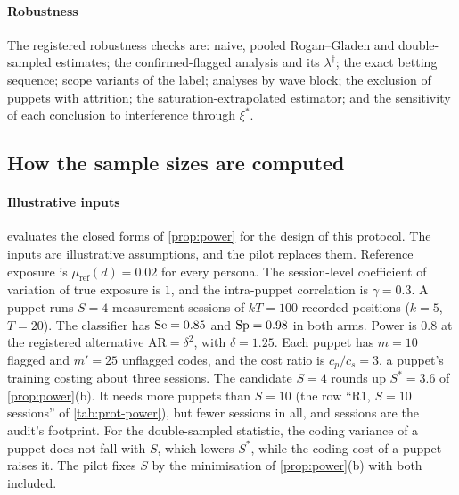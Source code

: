 \paragraph{Robustness}
The registered robustness checks are: naive, pooled Rogan--Gladen and double-sampled estimates; the confirmed-flagged analysis and its $\lambda^\dagger$; the exact betting sequence; scope variants of the label; analyses by wave block; the exclusion of puppets with attrition; the saturation-extrapolated estimator; and the sensitivity of each conclusion to interference through $\xi^\ast$.

\subsection{How the sample sizes are computed}\label{sec:prot-sizes}

\paragraph{Illustrative inputs}
 evaluates the closed forms of \cref{prop:power} for the design of this protocol. The inputs are illustrative assumptions, and the pilot replaces them. Reference exposure is $\mu_{\mathrm{ref}}(d)=0.02$ for every persona. The session-level coefficient of variation of true exposure is $1$, and the intra-puppet correlation is $\gamma=0.3$. A puppet runs $S=4$ measurement sessions of $kT=100$ recorded positions ($k=5$, $T=20$). The classifier has $\mathrm{Se}=0.85$ and $\mathrm{Sp}=0.98$ in both arms. Power is $0.8$ at the registered alternative $\mathrm{AR}=\delta^2$, with $\delta=1.25$. Each puppet has $m=10$ flagged and $m'=25$ unflagged codes, and the cost ratio is $c_p/c_s=3$, a puppet's training costing about three sessions. The candidate $S=4$ rounds up $S^\ast=3.6$ of \cref{prop:power}(b). It needs more puppets than $S=10$ (the row ``R1, $S=10$ sessions'' of \cref{tab:prot-power}), but fewer sessions in all, and sessions are the audit's footprint. For the double-sampled statistic, the coding variance of a puppet does not fall with $S$, which lowers $S^\ast$, while the coding cost of a puppet raises it. The pilot fixes $S$ by the minimisation of \cref{prop:power}(b) with both included.

